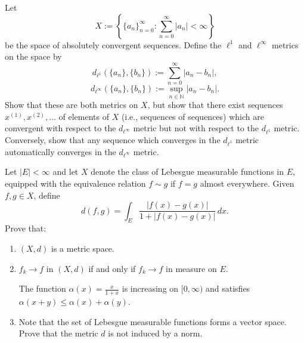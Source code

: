 \begin{solution}
\end{solution}

\pagebreak


\begin{problem}{5}
Let
\[
X := \left\{\{a_n\}_{n=0}^\infty : \sum_{n=0}^\infty |a_n| < \infty \right\}
\]
be the space of absolutely convergent sequences. Define the $\ell^1$ and $\ell^\infty$ metrics on the space by
\[
d_{\ell^1}(\{a_n\}, \{b_n\}) := \sum_{n=0}^\infty |a_n - b_n|,
\]
\[
d_{\ell^\infty}(\{a_n\}, \{b_n\}) := \sup_{n \in \mathbb{N}} |a_n - b_n|.
\]
Show that these are both metrics on $X$, but show that there exist sequences $x^{(1)}, x^{(2)}, \ldots$ of elements of $X$ (i.e., sequences of sequences) which are convergent with respect to the $d_{\ell^\infty}$ metric but not with respect to the $d_{\ell^1}$ metric. Conversely, show that any sequence which converges in the $d_{\ell^1}$ metric automatically converges in the $d_{\ell^\infty}$ metric.
\end{problem}

\begin{solution}
\end{solution}

\pagebreak

\begin{problem}{6}
Let $|E| < \infty$ and let $X$ denote the class of Lebesgue measurable functions in $E$, equipped with the equivalence relation $f \sim g$ if $f = g$ almost everywhere. Given $f, g \in X$, define
\[
d(f, g) = \int_E \frac{|f(x) - g(x)|}{1 + |f(x) - g(x)|} \, dx.
\]
Prove that:
\begin{enumerate}
    \item $(X, d)$ is a metric space.
    \item $f_k \to f$ in $(X, d)$ if and only if $f_k \to f$ in measure on $E$.

     The function $\alpha(x) = \frac{x}{1+x}$ is increasing on $[0, \infty)$ and satisfies $\alpha(x+y) \leq \alpha(x) + \alpha(y)$.

    \item Note that the set of Lebesgue measurable functions forms a vector space. Prove that the metric $d$ is not induced by a norm.

\end{enumerate}
\end{problem}

\begin{solution}
\end{solution}

